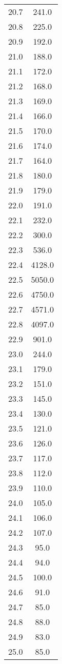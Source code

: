 \begin{table}
\begin{minipage}{0.5\textwidth}
\begin{tabular}{c c}
20.7	&	241.0\\
20.8	&	225.0\\
20.9	&	192.0\\
21.0	&	188.0\\
21.1	&	172.0\\
21.2	&	168.0\\
21.3	&	169.0\\
21.4	&	166.0\\
21.5	&	170.0\\
21.6	&	174.0\\
21.7	&	164.0\\
21.8	&	180.0\\
21.9	&	179.0\\
22.0	&	191.0\\
22.1	&	232.0\\
22.2	&	300.0\\
22.3	&	536.0\\
22.4	&	4128.0\\
22.5	&	5050.0\\
22.6	&	4750.0\\
22.7	&	4571.0\\
22.8	&	4097.0\\
22.9	&	901.0\\
23.0	&	244.0\\
23.1	&	179.0\\
23.2	&	151.0\\
23.3	&	145.0\\
23.4	&	130.0\\
23.5	&	121.0\\
23.6	&	126.0\\
23.7	&	117.0\\
23.8	&	112.0\\
23.9	&	110.0\\
24.0	&	105.0\\
24.1	&	106.0\\
24.2	&	107.0\\
24.3	&	95.0\\
24.4	&	94.0\\
24.5	&	100.0\\
24.6	&	91.0\\
24.7	&	85.0\\
24.8	&	88.0\\
24.9	&	83.0\\
25.0	&	85.0\\
    \bottomrule
\end{tabular}
\end{minipage}
\end{table}

